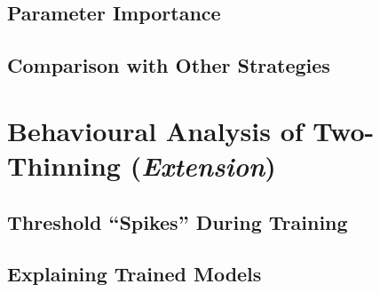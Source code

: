 \subsection{Parameter Importance}


\subsection{Comparison with Other Strategies}


\section{Behavioural Analysis of Two-Thinning (\textit{Extension})}


\subsection{Threshold ``Spikes'' During Training}


\subsection{Explaining Trained Models}